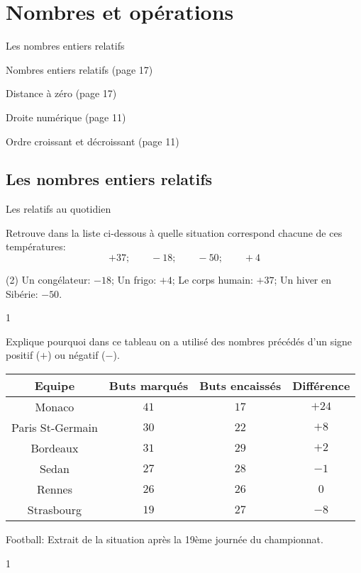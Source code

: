 \documentclass[a4paper,11pt]{report}
\begin{document}
\newcommand{\chapterName}{Nombres et opérations}
\newcommand{\serieName}{Les nombres entiers relatifs}

\chapter*{\chapterName}
\thispagestyle{empty}

\begin{amL}{\serieName}{
\item Nombres entiers relatifs (page 17)
\item Distance à zéro (page 17)
\item Droite numérique (page 11)
\item Ordre croissant et décroissant (page 11)
}
\end{amL}

\section*{\serieName}
\setcounter{page}{1}
\thispagestyle{firstPage}



\begin{QSJ}{39}{1}
\end{QSJ}
\begin{resolu}{Les relatifs au quotidien}{
Retrouve dans la liste ci-dessous à quelle situation correspond chacune de ces températures: 
\[+37;\quad\quad -18;\quad\quad   -50; \quad \quad +4\]
\begin{tasks}(2)
\task Un congélateur: $-18$;
\task Un frigo: $+4$;
\task Le corps humain: $+37$;
\task Un hiver en Sibérie: $-50$.
\end{tasks}}
{1}
\end{resolu}

\begin{exop}
{Explique pourquoi dans ce tableau on a utilisé des nombres précédés d'un signe positif ($+$) ou négatif ($-$).
\begin{center}
\begin{tabular}{|c||c||c||c|}
 \hline
  Equipe & Buts marqués &  Buts encaissés & Différence\\   
\hline
Monaco &    $41$  & $17$    & $+24$ \\
 \hline
Paris St-Germain &$30$&$22$&$+8$ \\
 \hline
Bordeaux  &$31$      & $29$    &    $+2$ \\ 
\hline
Sedan &$27$      &$28$     &$-1$ \\
\hline
Rennes& $26$     & $26$    &    $0$\\ 
 \hline     
Strasbourg &    $19$  & $27$    & $-8$\\
\hline  
\end{tabular}  
\end{center}
\vspace{-0.5cm}
\begin{center}
\tiny{Football: Extrait de la situation après la 19ème journée du championnat.}   
\end{center}
\vspace{-0.5cm}}
{1}
\end{exop}
\end{document}
